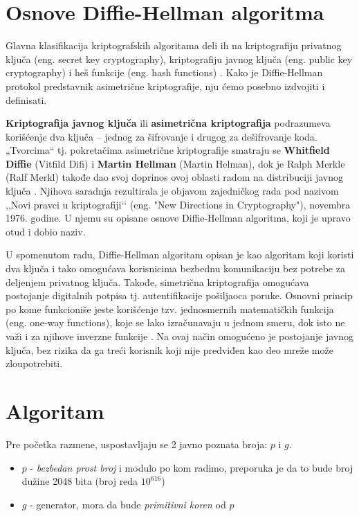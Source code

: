 \documentclass[a4paper]{article}
\begin{document}
\section{Osnove Diffie-Hellman algoritma}
Glavna klasifikacija kriptografskih algoritama deli ih na kriptografiju privatnog ključa (eng. secret key cryptography), kriptografiju javnog ključa (eng. public key cryptography) i heš funkcije (eng. hash functions) \cite{cryptography}. Kako je Diffie-Hellman protokol predstavnik asimetrične kriptografije, nju ćemo posebno izdvojiti i definisati.

\textbf{Kriptografija javnog ključa} ili \textbf{asimetrična kriptografija} podrazumeva korišćenje dva ključa – jednog za šifrovanje i drugog za dešifrovanje koda. „Tvorcima“ tj. pokretačima asimetrične kriptografije smatraju se \textbf{Whitfield Diffie} (Vitfild Difi) i \textbf{Martin Hellman} (Martin Helman), dok je Ralph Merkle (Ralf Merkl) takođe dao svoj doprinos ovoj oblasti radom na distribuciji javnog ključa \cite{Diffie-Hellman}. Njihova saradnja rezultirala je objavom zajedničkog rada pod nazivom ,,Novi pravci u kriptografiji‘‘ (eng. "New Directions in Cryptography"), novembra 1976. godine. U njemu su opisane osnove Diffie-Hellman algoritma, koji je upravo otud i dobio naziv. %

U spomenutom radu, Diffie-Hellman algoritam opisan je kao algoritam koji koristi dva ključa i tako omogućava korisnicima bezbednu komunikaciju bez potrebe za deljenjem privatnog ključa. Takođe, simetrična kriptografija omogućava postojanje digitalnih potpisa tj. autentifikacije pošiljaoca poruke. Osnovni princip po kome funkcioniše jeste korišćenje tzv. jednosmernih matematičkih funkcija (eng. one-way functions), koje se lako izračunavaju u jednom smeru, dok isto ne važi i za njihove inverzne funkcije \cite{cryptography}. Na ovaj način omogućeno je postojanje javnog ključa, bez rizika da ga treći korisnik koji nije predviđen kao deo mreže može zloupotrebiti. 



\section{Algoritam}
\label{sec:algoritam}

Pre početka razmene, uspostavljaju se 2 javno poznata broja: $p$ i $g$.
\begin{itemize}

    \item $p$ - \emph{bezbedan prost broj} i modulo po kom radimo, preporuka je da 
        to bude broj dužine 2048 bita (broj reda $10^{616}$) \cite{logjam}
    \item $g$ - generator, mora da bude \emph{primitivni koren} od $p$

\end{itemize}
\end{document}
